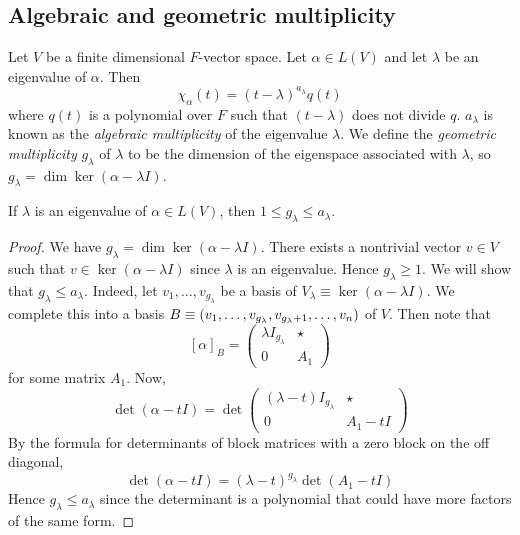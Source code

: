 \subsection{Algebraic and geometric multiplicity}
\begin{definition}
	Let \( V \) be a finite dimensional \( F \)-vector space.
	Let \( \alpha \in L(V) \) and let \( \lambda \) be an eigenvalue of \( \alpha \).
	Then
	\[
		\chi_\alpha(t) = (t-\lambda)^{a_\lambda} q(t)
	\]
	where \( q(t) \) is a polynomial over \( F \) such that \( (t-\lambda) \) does not divide \( q \).
	\( a_\lambda \) is known as the \textit{algebraic multiplicity} of the eigenvalue \( \lambda \).
	We define the \textit{geometric multiplicity} \( g_\lambda \) of \( \lambda \) to be the dimension of the eigenspace associated with \( \lambda \), so \( g_\lambda = \dim \ker (\alpha - \lambda I) \).
\end{definition}
\begin{lemma}
	If \( \lambda \) is an eigenvalue of \( \alpha \in L(V) \), then \( 1 \leq g_\lambda \leq a_\lambda \).
\end{lemma}
\begin{proof}
	We have \( g_\lambda = \dim \ker (\alpha - \lambda I) \).
	There exists a nontrivial vector \( v \in V \) such that \( v \in \ker(\alpha - \lambda I) \) since \( \lambda \) is an eigenvalue.
	Hence \( g_\lambda \geq 1 \).
	We will show that \( g_\lambda \leq a_\lambda \).
	Indeed, let \( v_1, \dots, v_{g_\lambda} \) be a basis of \( V_\lambda \equiv \ker (\alpha - \lambda I) \).
	We complete this into a basis \( B \equiv \qty(v_1, \dots, v_{g_\lambda}, v_{g_\lambda + 1}, \dots, v_n) \) of \( V \).
	Then note that
	\[
		[\alpha]_B = \begin{pmatrix}
			\lambda I_{g_\lambda} & \star \\
			0                     & A_1
		\end{pmatrix}
	\]
	for some matrix \( A_1 \).
	Now,
	\[
		\det (\alpha - tI) = \det \begin{pmatrix}
			(\lambda - t) I_{g_\lambda} & \star     \\
			0                           & A_1 - t I
		\end{pmatrix}
	\]
	By the formula for determinants of block matrices with a zero block on the off diagonal,
	\[
		\det (\alpha - tI) = (\lambda-t)^{g_\lambda} \det(A_1 - t I)
	\]
	Hence \( g_\lambda \leq a_\lambda \) since the determinant is a polynomial that could have more factors of the same form.
\end{proof}
